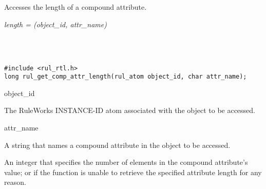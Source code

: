 \section*{}

Accesses the length of a compound attribute.

\Syntax

\it{length} = (\it{object\_id},
\it{attr\_name})

\begin{args}
   \\
   \\
\end{args}

\CBinding
\begin{verbatim}
#include <rul_rtl.h>
long rul_get_comp_attr_length(rul_atom object_id, char attr_name);
\end{verbatim}

\begin{arguments}
\item[object\_id]

  The RuleWorks INSTANCE-ID atom associated with the object to be
  accessed.

\item[attr\_name]

  A string that names a compound attribute in the object to be
  accessed.
\end{arguments}

\ReturnValue

An integer that specifies the number of elements in the compound
attribute's value; or  if the function is unable
to retrieve the specified attribute length for any reason.

\begin{seealso}



\end{seealso}

\section*{}

